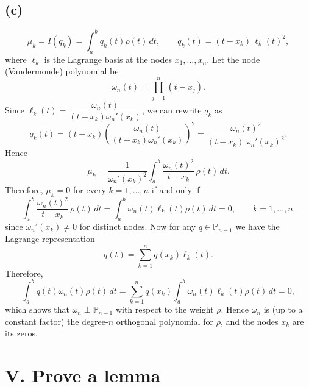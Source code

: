 \documentclass[a4paper]{article}
\begin{document}
\subsection*{(c)}
\[
\mu_k = I(q_k)=\int_a^b q_k(t)\rho(t)\,dt,
\qquad
q_k(t)=(t-x_k)\,\ell_k(t)^2,
\]
where \(\ell_k\) is the Lagrange basis at the nodes \(x_1,\dots,x_n\).
Let the node (Vandermonde) polynomial be
\[
\omega_n(t)=\prod_{j=1}^n (t-x_j).
\]
Since \(\ell_k(t)=\dfrac{\omega_n(t)}{(t-x_k)\omega_n'(x_k)}\), we can rewrite \(q_k\) as
\[
q_k(t)=(t-x_k)\left(\frac{\omega_n(t)}{(t-x_k)\omega_n'(x_k)}\right)^2
=\frac{\omega_n(t)^2}{(t-x_k)\,\omega_n'(x_k)^2}.
\]
Hence
\[
\mu_k=\frac{1}{\omega_n'(x_k)^2}\int_a^b \frac{\omega_n(t)^2}{t-x_k}\,\rho(t)\,dt.
\]
Therefore, \(\mu_k=0\) for every \(k=1,\dots,n\) if and only if
\[
\int_a^b \frac{\omega_n(t)^2}{t-x_k}\,\rho(t)\,dt=\int_a^b \omega_n(t)\ell_k(t)\rho(t)\,dt= 0,
\qquad k=1,\dots,n.
\]
since $\omega_n'(x_k)\neq 0$ for distinct nodes.
Now for any $q\in\mathbb P_{n-1}$ we have the Lagrange representation
\[
q(t)=\sum_{k=1}^n q(x_k)\ell_k(t).
\]
Therefore,
\[
\int_a^b q(t)\omega_n(t)\rho(t)\,dt
=\sum_{k=1}^n q(x_k)\int_a^b \omega_n(t)\ell_k(t)\rho(t)\,dt=0,
\]
which shows that $\omega_n\perp \mathbb P_{n-1}$ with respect to the weight $\rho$.
Hence $\omega_n$ is (up to a constant factor) the degree-$n$ orthogonal polynomial for $\rho$,
and the nodes $x_k$ are its zeros.



\section*{V. Prove a lemma}
\end{document}
